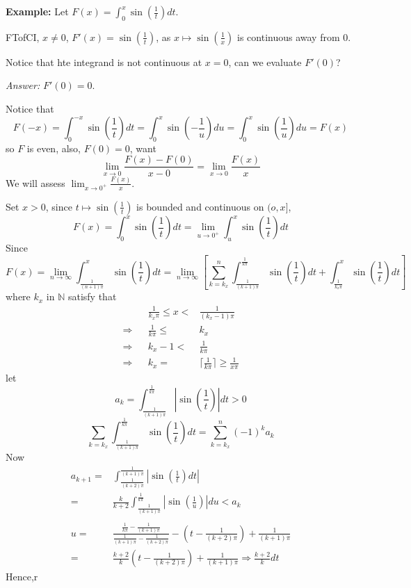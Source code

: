 \documentclass[12pt]{article}
\theoremstyle{plain}
\newcommand{\abs}[1]{\left| #1 \right|}
\newcommand{\ceil}[1]{\lceil #1 \rceil}
\newcommand{\mN}{{\mathbb{N}}}
\begin{document}
{\color{Brown}
\textbf{Example: }
Let $F(x) = \int_0^x \sin(\frac 1t) dt$.

FTofCI, $x \neq 0$, $F'(x) = \sin(\frac 1t)$, as $x\mapsto \sin(\frac 1x)$ is 
continuous away from $0$. 

Notice that hte integrand is not continuous at $x = 0$, can we evaluate
$F'(0)$?  

\textit{Answer:} $F'(0) = 0$. 

Notice that 
\[
	F(-x) = \int_0^{-x} \sin (\frac 1t)dt = \int_0^x \sin(-\frac 1u)du
	= \int_0^x \sin(\frac 1u)du = F(x)
\]
so $F$ is even, also, $F(0) = 0$, want 
\[
	\lim_{x\to 0} \frac{F(x) - F(0)}{x-0} 
	= \lim_{x\to 0} \frac{F(x)}x 
\]
We will assess $\lim_{x\to 0^+} \frac{F(x)}x$. 

Set $x > 0$, since $t \mapsto \sin(\frac 1t)$ is bounded and continuous on
$(o,x]$,
\[
	F(x) = \int_0^x \sin(\frac 1t)dt
	= \lim_{u\to 0^+} \int_u^x \sin(\frac 1t)dt
\]
Since 
\[
	F(x) = \lim_{n\to\infty} \int_{\frac1{(n+1)\pi}}^x \sin (\frac 1t)dt 
	= \lim_{n\to\infty}
	\left[
		\sum_{k=k_x}^n \int_{\frac1{(k+1)\pi}}^{\frac 1{k\pi}} 
		\sin(\frac 1t)dt 
		+ 
		\int_{\frac1{k_x\pi}}^x \sin (\frac 1t)dt
	\right]
\]
where $k_x$ in $\mN$ satisfy that 
\begin{align*}
	& &\frac1{k_x\pi} \leq x <& \frac 1{(k_x-1)\pi}	\\
	\Rightarrow &	&\frac 1{k\pi} \leq& k_x	\\
	\Rightarrow &	&k_x - 1 <& \frac 1{k\pi}	\\
	\Rightarrow &	&k_x =& \ceil{\frac1{k\pi}}	\geq \frac1{x\pi}
\end{align*}
let 
\[
	a_k = \int_{\frac1{(k+1)\pi}}^{\frac 1{k\pi}} \abs{\sin(\frac 1t)}dt > 0
\]
\[
	\sum_{k=k_x} \int_{\frac1{(k+1)\pi}}^{\frac 1{k\pi}} \sin(\frac 1t)dt 
	=\sum_{k=k_x}^n (-1)^k a_k
\]
Now 
\begin{align*}
	a_{k+1} 
	=& \int_{\frac1{(k+2)\pi}}^{\frac 1{(k+1)\pi}} \abs{\sin(\frac 1t)dt}	\\
	=& \frac k{k+2} 
	\int_{\frac1{(k+1)\pi}}^{\frac 1{k\pi}} \abs{\sin(\frac 1u)}du< a_k		\\\\
	u =& \frac{\frac1{k\pi}-\frac1{(k+1)\pi}}{\frac1{(k+1)\pi}-\frac1{(k+2)\pi}}
	- (t - \frac 1{(k+2)\pi}) + \frac 1{(k+1)\pi}	\\
	=& \frac{k+2}k (t- \frac1{(k+2)\pi}) + \frac1{(k+1)\pi} 
	\Rightarrow \frac{k+2}k dt
\end{align*}
Hence,r
}


\newpage
\end{document}
